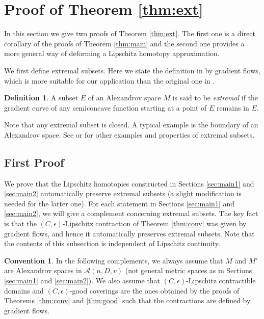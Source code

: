 \documentclass[a4paper,12pt]{amsart}
\theoremstyle{plain}
\theoremstyle{definition}
\newtheorem{dfn}[thm]{Definition}
\newtheorem{conv}[thm]{Convention}
\numberwithin{thm}{section}
\numberwithin{equation}{section}
\begin{document}
\section{Proof of Theorem \ref{thm:ext}}\label{sec:ext}

In this section we give two proofs of Theorem \ref{thm:ext}.
The first one is a direct corollary of the proofs of Theorem \ref{thm:main} and the second one provides a more general way of deforming a Lipschitz homotopy approximation.

We first define extremal subsets.
Here we state the definition in \cite{Pet:sc} by gradient flows, which is more suitable for our application than the original one in \cite{PP:ext}.

\begin{dfn}\label{dfn:ext}
A subset $E$ of an Alexandrov space $M$ is said to be \textit{extremal} if the gradient curve of any semiconcave function starting at a point of $E$ remains in $E$.
\end{dfn}

Note that any extremal subset is closed.
A typical example is the boundary of an Alexandrov space.
See \cite[\S4]{Pet:sc} or \cite{PP:ext} for other examples and properties of extremal subsets.

\subsection{First Proof}

We prove that the Lipschitz homotopies constructed in Sections \ref{sec:main1} and \ref{sec:main2} automatically preserve extremal subsets (a slight modification is needed for the latter one).
For each statement in Sections \ref{sec:main1} and \ref{sec:main2}, we will give a complement concerning extremal subsets.
The key fact is that the $(C,\epsilon)$-Lipschitz contraction of Theorem \ref{thm:conv} was given by gradient flows, and hence it automatically preserves extremal subsets.
Note that the contents of this subsection is independent of Lipschitz continuity.

\begin{conv}
In the following complements, we always assume that $M$ and $M'$ are Alexandrov spaces in $\mathcal A(n,D,v)$ (not general metric spaces as in Sections \ref{sec:main1} and \ref{sec:main2}).
We also assume that $(C,\epsilon)$-Lipschitz contractible domains and $(C,\epsilon)$-good coverings are the ones obtained by the proofs of Theorems \ref{thm:conv} and \ref{thm:good} such that the contractions are defined by gradient flows.
\end{conv}
\end{document}

